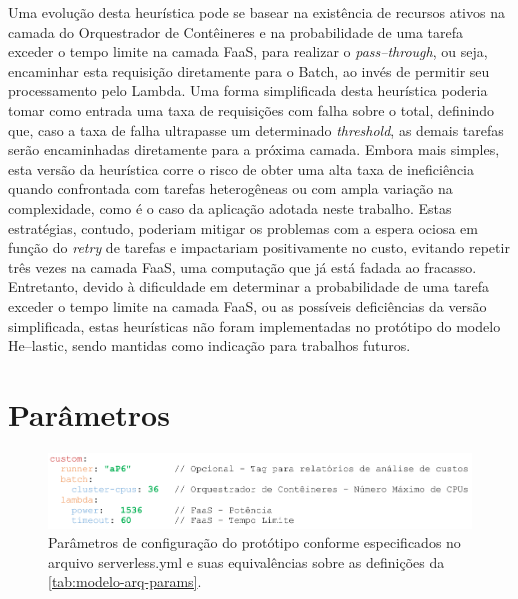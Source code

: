 \documentclass[english,brazilian]{UNISINOSmonografia} %
\begin{document}
Uma evolução desta heurística pode se basear na existência de recursos ativos na camada do Orquestrador de Contêineres e na probabilidade de uma tarefa exceder o tempo limite na camada FaaS, para realizar o \textit{pass--through}, ou seja, encaminhar esta requisição diretamente para o Batch, ao invés de permitir seu processamento pelo Lambda.
%
Uma forma simplificada desta heurística poderia tomar como entrada uma taxa de requisições com falha sobre o total, definindo que, caso a taxa de falha ultrapasse um determinado \textit{threshold}, as demais tarefas serão encaminhadas diretamente para a próxima camada.
%
Embora mais simples, esta versão da heurística corre o risco de obter uma alta taxa de ineficiência quando confrontada com tarefas heterogêneas ou com ampla variação na complexidade, como é o caso da aplicação adotada neste trabalho.
%
Estas estratégias, contudo, poderiam mitigar os problemas com a espera ociosa em função do \textit{retry} de tarefas e impactariam positivamente no custo, evitando repetir três vezes na camada FaaS, uma computação que já está fadada ao fracasso.
%
Entretanto, devido à dificuldade em determinar a probabilidade de uma tarefa exceder o tempo limite na camada FaaS, ou as possíveis deficiências da versão simplificada, estas heurísticas não foram implementadas no protótipo do modelo \textsf{He}--lastic, sendo mantidas como indicação para trabalhos futuros.




\section{Parâmetros}


\begin{figure}[bt]
	\centering%
	\begin{minipage}{\textwidth}
		\caption{Parâmetros de configuração do protótipo conforme especificados no arquivo serverless.yml e suas equivalências sobre as definições da \autoref{tab:modelo-arq-params}.}
		\label{fig:metodologia-parametros-yaml}
		\vspace{1ex}
		\includegraphics[width=\textwidth]{metodologia-parametros-yaml}
	\end{minipage}
\end{figure}
\end{document}
